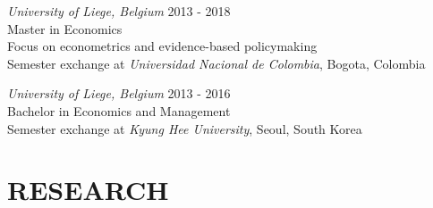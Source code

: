 \documentclass[margin,a4paper]{res}
\begin{document}
\begin{resume}

                
		{\sl University of Liege, Belgium}  \hfill 2013 - 2018 \\
                 Master in Economics \\
                Focus on econometrics and evidence-based policymaking \\
                                		Semester exchange at {\sl Universidad Nacional de Colombia}, Bogota, Colombia 


		
		{\sl University of Liege, Belgium } \hfill  2013 -  2016\\
                Bachelor in Economics and Management \\
                			Semester exchange at {\sl Kyung Hee University}, Seoul, South Korea



               
                
                                	

                                	
			                
                
        
                

 
 

\section{RESEARCH}


\end{resume}
\end{document}
